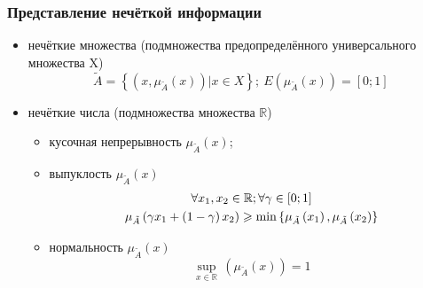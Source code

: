 \documentclass[12pt]{beamer}
\begin{document}
\begin{frame}
  \frametitle{Представление нечёткой информации}
  \begin{itemize}
    \item нечёткие множества (подмножества предопределённого универсального множества X)
      \begin{equation}
      	\tilde{A}=\left\{ \left( x, \mu_{\tilde A}\left( x \right) \right)\left| x\in X \right. \right\};\ E \left( \mu_{\tilde A} \left( x \right) \right) = \left[0; 1 \right]
      \end{equation}      
    \item нечёткие числа (подмножества множества $\mathbb{R}$)
      \begin{itemize}
        \item кусочная непрерывность $\mu_{\tilde A}\left( x \right)$;
        \item выпуклость $\mu_{\tilde A}\left( x \right)$
      	\begin{gather}
      	  \forall x_1, x_2 \in \mathbb{R}; \forall \gamma \in \left[ 0;1 \right] \notag \\
      	  \mu_{\tilde A}\left( \gamma x_1+\left( 1-\gamma  \right)x_2 \right)\geqslant \min \left\{ \mu_{\tilde A}\left( x_1 \right),\mu_{\tilde A}\left( x_2 \right) \right\}
      	\end{gather}
      	\item нормальность $\mu_{\tilde A}\left( x \right)$
        	\begin{equation}
        		\underset{x\in \mathbb{R}}{\mathop {\sup}}{}\, \left( \mu_{\tilde A} \left( x \right) \right)=1
        	\end{equation}
      \end{itemize}
  \end{itemize}
\end{frame}
\end{document}
